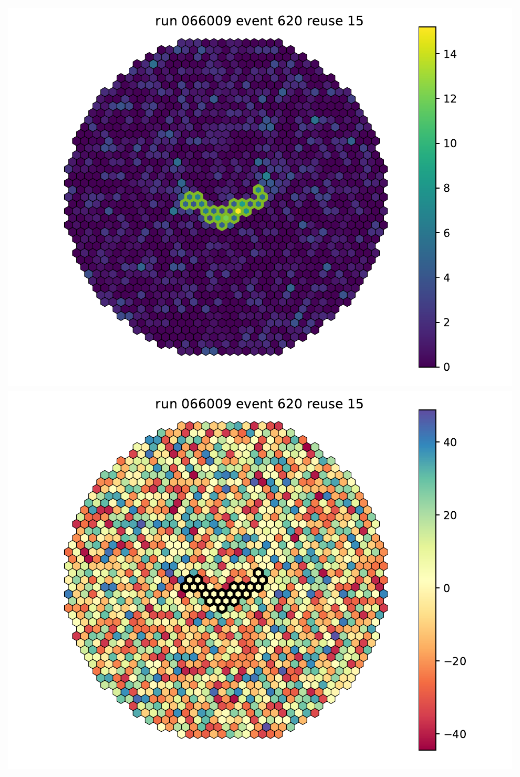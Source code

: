 \begin{withoutheadline}
\begin{frame}{}
\begin{columns}[onlytextwidth]
\begin{column}{0.33\textwidth}
        \includegraphics[width=\textwidth, page=3]{fig/camera_images/cleaning_facttools_pe_066009.pdf}
        \includegraphics[width=\textwidth, page=3]{fig/camera_images/cleaning_facttools_arrival_times_066009.pdf}
      \end{column}
    \end{columns}
  \end{frame}
\end{withoutheadline}

